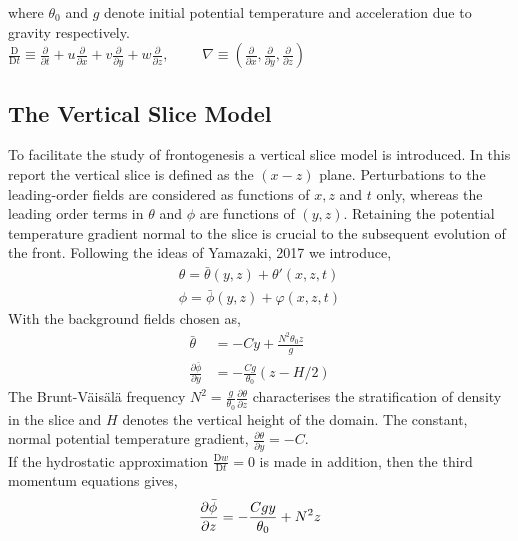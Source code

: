 where $\theta_0$ and $g$ denote initial potential temperature and acceleration due to gravity respectively. \\
$\frac{\mathrm{D}}{\mathrm{D}t} \equiv \frac{\partial}{\partial t} + u\frac{\partial}{\partial x} + v\frac{\partial}{\partial y} + w\frac{\partial}{\partial z},\qquad$ 
$\nabla \equiv \left(\frac{\partial}{\partial x}, \frac{\partial}{\partial y},\frac{\partial}{\partial z}\right)$
\subsection{The Vertical Slice Model}
To facilitate the study of frontogenesis a vertical slice model is introduced. In this report the vertical slice is defined as the $\left(x-z\right)$ plane. Perturbations to the leading-order fields are considered as functions of $x,z$ and $t$ only, whereas the leading order terms in $\theta$ and $\phi$ are functions of $\left(y,z\right)$. Retaining the potential temperature gradient normal to the slice is crucial to the subsequent evolution of the front. Following the ideas of Yamazaki, 2017 \cite{Yamazaki2017} we introduce,
\begin{equation}
	\begin{aligned}
		\theta = \bar{\theta}(y,z) + \theta'(x,z,t)\\ 
		\phi = \bar{\phi}(y,z) + \varphi(x,z,t)
	\end{aligned}
\end{equation}
With the background fields chosen as,
\begin{equation}
	\begin{aligned}
		\bar{\theta} &= -Cy + \frac{N^2\theta_0z}{g}\\ 
		\frac{\partial \bar{\phi}}{\partial y} &= -\frac{Cg}{\theta_0}\left(z - H/2\right)
	\end{aligned}
\label{bgTP}
\end{equation}
The Brunt-V\"{a}is\"{a}l\"{a} frequency $N^2 = \frac{g}{\theta_0}\frac{\partial \theta}{\partial z}$ characterises the stratification of density in the slice and $H$ denotes the vertical height of the domain. The constant, normal potential temperature gradient, $\frac{\partial \theta}{\partial y} = -C$.\\
\linebreak
If the hydrostatic approximation $\frac{\mathrm{D}w}{\mathrm{D}t} = 0$ is made in addition, then the third momentum equations gives,
\begin{equation}
\frac{\partial \bar{\phi}}{\partial z} = -\frac{Cgy}{\theta_0} + N^2z\\
\label{bgP}
\end{equation}
